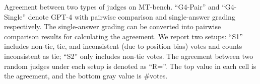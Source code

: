 \begin{table}[h]
\centering
\vspace{-1em}
\caption{Agreement between two types of judges on MT-bench. ``G4-Pair'' and ``G4-Single'' denote GPT-4 with pairwise comparison and single-answer grading respectively.
The single-answer grading can be converted into pairwise comparison results for calculating the agreement.
We report two setups: ``S1'' includes non-tie, tie, and inconsistent (due to position bias) votes and counts inconsistent as tie; ``S2'' only includes non-tie votes.
The agreement between two random judges under each setup is denoted as ``R=''.
The top value in each cell is the agreement, and the bottom gray value is \#votes.
}
\footnotesize
\begin{subtable}[t]{0.48\textwidth}
\caption{First Turn}
\label{table:agreement_mt_bench_first_turn}
\end{subtable}
\hfill
\begin{subtable}[t]{0.48\textwidth}
\end{subtable}
\end{table}
